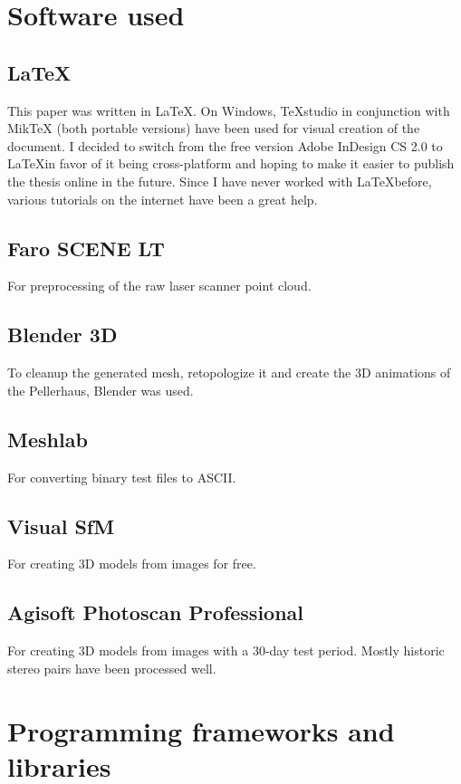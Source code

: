 \section{Software used}

\subsection{\LaTeX}
This paper was written in \LaTeX. On Windows, TeXstudio in conjunction with MikTeX (both portable versions) have been used for visual creation of the document. I decided to switch from the free version Adobe InDesign CS 2.0 to \LaTeX in favor of it being cross-platform and hoping to make it easier to publish the thesis online in the future. Since I have never worked with \LaTeX before, various tutorials \parencite{ytLaTeX,webLaTeX-Tutorial} on the internet have been a great help.

\subsection{Faro SCENE LT}
For preprocessing of the raw laser scanner point cloud.

\subsection{Blender 3D}
To cleanup the generated mesh, retopologize it and create the 3D animations of the Pellerhaus, Blender was used.

\subsection{Meshlab}
For converting binary test files to ASCII.

\subsection{Visual SfM}
For creating 3D models from images for free.

\subsection{Agisoft Photoscan Professional}
For creating 3D models from images with a 30-day test period. Mostly historic stereo pairs have been processed well.

\section{Programming frameworks and libraries}

